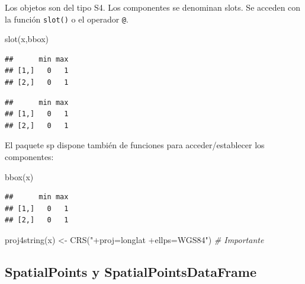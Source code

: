 \documentclass[
  spanish,
]{book}
\newenvironment{Shaded}{\begin{snugshade}}{\end{snugshade}}
\newcommand{\CommentTok}[1]{\textcolor[rgb]{0.56,0.35,0.01}{\textit{#1}}}
\newcommand{\DocumentationTok}[1]{\textcolor[rgb]{0.56,0.35,0.01}{\textbf{\textit{#1}}}}
\newcommand{\FunctionTok}[1]{\textcolor[rgb]{0.00,0.00,0.00}{#1}}
\newcommand{\NormalTok}[1]{#1}
\newcommand{\OtherTok}[1]{\textcolor[rgb]{0.56,0.35,0.01}{#1}}
\newcommand{\SpecialCharTok}[1]{\textcolor[rgb]{0.00,0.00,0.00}{#1}}
\newcommand{\StringTok}[1]{\textcolor[rgb]{0.31,0.60,0.02}{#1}}
\theoremstyle{break}
\theoremstyle{definition}
\theoremstyle{definition}
\theoremstyle{definition}
\theoremstyle{definition}
\theoremstyle{remark}
\begin{document}
Los objetos son del tipo S4.
Los componentes se denominan slots.
Se acceden con la función \texttt{slot()} o el operador \texttt{@}.

\begin{Shaded}
\begin{Highlighting}[]
\FunctionTok{slot}\NormalTok{(x,}\StringTok{\textquotesingle{}bbox\textquotesingle{}}\NormalTok{)}
\end{Highlighting}
\end{Shaded}

\begin{verbatim}
##      min max
## [1,]   0   1
## [2,]   0   1
\end{verbatim}

\begin{Shaded}
\end{Shaded}

\begin{verbatim}
##      min max
## [1,]   0   1
## [2,]   0   1
\end{verbatim}

El paquete sp dispone también de funciones para acceder/establecer
los componentes:

\begin{Shaded}
\begin{Highlighting}[]
\FunctionTok{bbox}\NormalTok{(x)}
\end{Highlighting}
\end{Shaded}

\begin{verbatim}
##      min max
## [1,]   0   1
## [2,]   0   1
\end{verbatim}

\begin{Shaded}
\begin{Highlighting}[]
\FunctionTok{proj4string}\NormalTok{(x) }\OtherTok{\textless{}{-}} \FunctionTok{CRS}\NormalTok{(}\StringTok{"+proj=longlat +ellps=WGS84"}\NormalTok{) }\CommentTok{\# Importante}
\end{Highlighting}
\end{Shaded}

\hypertarget{spatialpoints-y-spatialpointsdataframe}{%
\subsection{SpatialPoints y SpatialPointsDataFrame}\label{spatialpoints-y-spatialpointsdataframe}}
\end{document}
